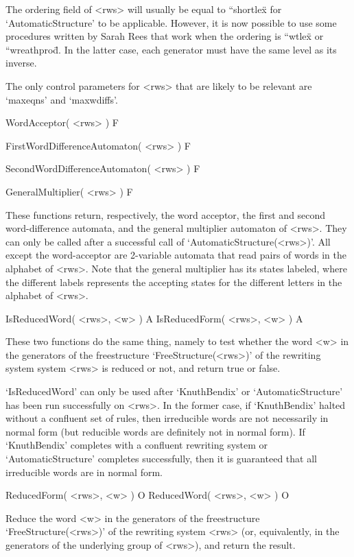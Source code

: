 The ordering field of <rws> will usually be equal to {``shortlex\"}
for `AutomaticStructure' to be applicable.
However, it is now possible to use some procedures written by Sarah Rees
that work when the ordering is {``wtlex\"} or {``wreathprod\"}. In the latter
case, each generator must have the same level as its inverse.

The only control parameters for <rws> that
are likely to be relevant are `maxeqns' and `maxwdiffs'.

\>WordAcceptor( <rws> ) F

\>FirstWordDifferenceAutomaton( <rws> ) F

\>SecondWordDifferenceAutomaton( <rws> ) F

\>GeneralMultiplier( <rws> ) F

These functions return, respectively, the word acceptor, the first and
second word-difference automata, and the general multiplier automaton
of <rws>. They can only be called after a successful call of
`AutomaticStructure(<rws>)'. All except the word-acceptor are 2-variable
automata that read pairs of words in the alphabet of <rws>.
Note that the general multiplier has
its states labeled, where the different labels represents the accepting
states for the different letters in the alphabet of <rws>.


\>IsReducedWord( <rws>, <w> ) A
\>IsReducedForm( <rws>, <w> ) A

These two functions do the same thing, namely to
test  whether the word <w> in  the generators of  the freestructure
`FreeStructure(<rws>)' of the rewriting system system
<rws> is reduced or not, and return true or false.

`IsReducedWord' can only be used after `KnuthBendix'
or `AutomaticStructure' has been run successfully on <rws>. In the former
case, if `KnuthBendix' halted without
a  confluent set of rules, then  irreducible words are not necessarily
in  normal form (but  reducible  words are  definitely  not in  normal
form).    If  `KnuthBendix' completes with    a  confluent rewriting system  or
`AutomaticStructure' completes  successfully, then  it   is guaranteed that 
all irreducible words are in normal form.

\medskip
\>ReducedForm( <rws>, <w> ) O
\>ReducedWord( <rws>, <w> ) O

Reduce the word  <w> in the generators of the freestructure
`FreeStructure(<rws>)' of the rewriting system  <rws>
(or, equivalently, in the    generators  of the underlying   group  of
<rws>), and return the result.

